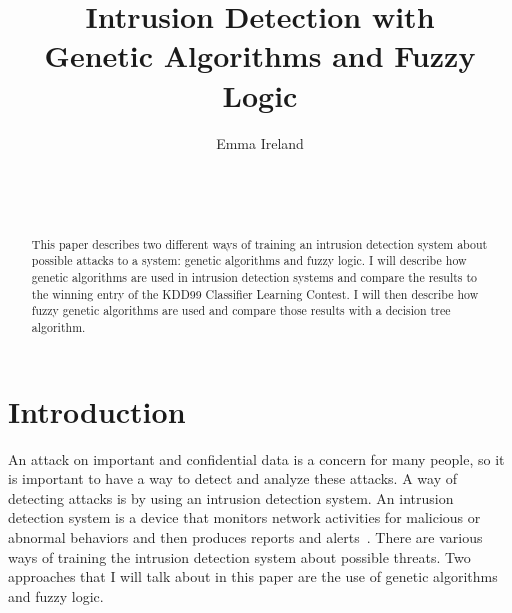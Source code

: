 \documentclass{sig-alternate}
\begin{document}

\title{Intrusion Detection with \\ Genetic Algorithms and Fuzzy Logic}


\author{
\alignauthor
Emma Ireland\\
	\\
	\\
	\\
}

\maketitle
\begin{abstract}
This paper describes two different ways of training an intrusion detection system about possible attacks to a system: genetic algorithms and fuzzy logic. I will describe how genetic algorithms are used in intrusion detection systems and compare the results to the winning entry of the KDD99 Classifier Learning Contest. I will then describe how fuzzy genetic algorithms are used and compare those results with a decision tree algorithm.
\end{abstract}




\section{Introduction}
An attack on important and confidential data is a concern for many people, so it is important to have a way to detect and analyze these attacks. A way of detecting attacks is by using an intrusion detection system. An intrusion detection system is a device that monitors network activities for malicious or abnormal behaviors and then produces reports and alerts~\cite{DBLP:journals/corr/abs-1204-1336}. There are various ways of training the intrusion detection system about possible threats. Two approaches that I will talk about in this paper are the use of genetic algorithms and fuzzy logic.
\end{document}

